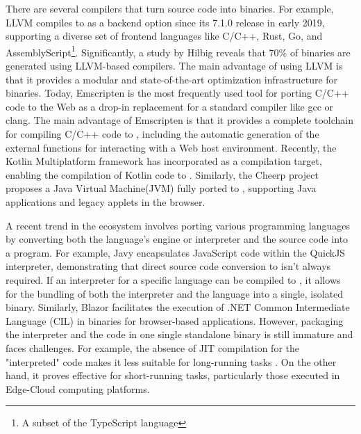 \vspace{-0.3cm}
There are several compilers that turn source code into \Wasm binaries. 
For example, LLVM compiles to \Wasm as a backend option since its 7.1.0 release in early 2019, supporting a diverse set of frontend languages like C/C++, Rust, Go, and AssemblyScript\footnote{A subset of the TypeScript language}.
Significantly, a study by Hilbig \cite{Hilbig2021AnES} reveals that 70\% of \Wasm binaries are generated using LLVM-based compilers. 
The main advantage of using LLVM is that it provides a modular and state-of-the-art optimization infrastructure for \Wasm binaries.
Today, Emscripten is the most frequently used tool for porting C/C++ code to the Web as a drop-in replacement for a standard compiler like gcc or clang.
The main advantage of Emscripten is that it provides a complete toolchain for compiling C/C++ code to \Wasm, including the automatic generation of the external functions for interacting with a Web host environment.
Recently, the Kotlin Multiplatform framework has incorporated \Wasm as a compilation target, enabling the compilation of Kotlin code to \Wasm.
Similarly, the Cheerp project proposes a Java Virtual Machine(JVM) fully ported to \Wasm, supporting Java applications and legacy applets in the browser. 

\pagebreak

\pagebreak

A recent trend in the \Wasm ecosystem involves porting various programming languages by converting both the language's engine or interpreter and the source code into a \Wasm program. 
For example, Javy encapsulates JavaScript code within the QuickJS interpreter, demonstrating that direct source code conversion to \Wasm isn't always required. 
If an interpreter for a specific language can be compiled to \Wasm, it allows for the bundling of both the interpreter and the language into a single, isolated \Wasm binary. 
Similarly, Blazor facilitates the execution of .NET Common Intermediate Language (CIL) in \Wasm binaries for browser-based applications. 
However, packaging the interpreter and the code in one single standalone \Wasm binary is still immature and faces challenges.
For example, the absence of JIT compilation for the "interpreted" code makes it less suitable for long-running tasks \cite{10.1145/3487552.3487827, 10.1145/3593434.3593454}. 
On the other hand, it proves effective for short-running tasks, particularly those executed in Edge-Cloud computing platforms.



